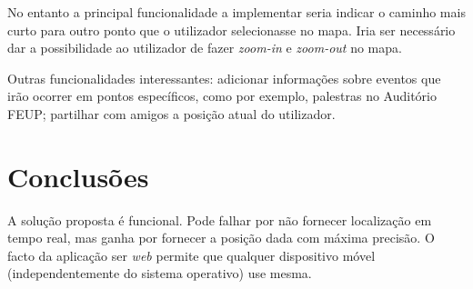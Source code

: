 \documentclass[twocolumn,twoside,11pt]{article}
\begin{document}
  No entanto a principal funcionalidade a implementar seria indicar o caminho mais curto para outro ponto que o utilizador selecionasse no mapa.
  Iria ser necessário dar a possibilidade ao utilizador de fazer \emph{zoom-in} e \emph{zoom-out} no mapa.

  Outras funcionalidades interessantes: adicionar informações sobre eventos que irão ocorrer em pontos específicos, como por exemplo, palestras no Auditório FEUP; partilhar com amigos a posição atual do utilizador.



\section{Conclusões} %
\label{sec:conclusoes}
  A solução proposta é funcional. Pode falhar por não fornecer localização em tempo real, mas ganha por fornecer a posição dada com máxima precisão.
  O facto da aplicação ser \emph{web} permite que qualquer dispositivo móvel (independentemente do sistema operativo) use mesma.



\renewcommand{\bibname}{Referências}



\end{document}

